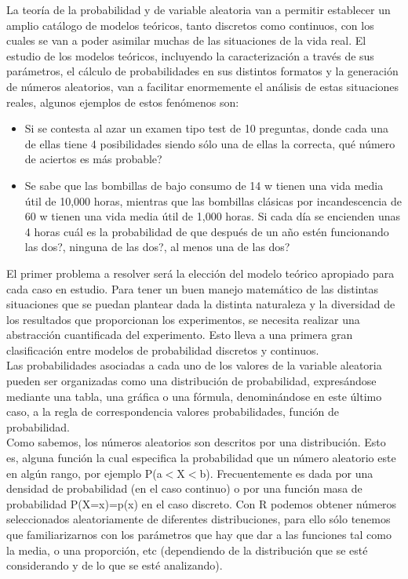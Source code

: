 \documentclass[12pt,letterpaper]{article}\usepackage[]{graphicx}\usepackage[]{color}
\begin{document}
La teor\'ia de la probabilidad y de variable aleatoria van a permitir establecer un amplio cat\'alogo de modelos te\'oricos, tanto discretos como continuos, con los cuales se van a poder asimilar muchas de las situaciones de la vida real. El estudio de los modelos te\'oricos, incluyendo la caracterizaci\'on a trav\'es de sus par\'ametros, el c\'alculo de probabilidades en sus distintos formatos y la generaci\'on de n\'umeros aleatorios, van a facilitar enormemente el an\'alisis de estas situaciones reales, algunos ejemplos de estos fen\'omenos son:\\

\begin{itemize}
  \item Si se contesta al azar un examen tipo test de 10 preguntas, donde cada una de ellas tiene 4 posibilidades siendo s\'olo una de ellas la correcta, \¿qu\'e n\'umero de aciertos es m\'as probable? 
  \item Se sabe que las bombillas de bajo consumo de 14 w tienen una vida media \'util de 10,000 horas, mientras que las bombillas cl\'asicas por incandescencia de 60 w tienen una vida media \'util de 1,000 horas. Si cada d\'ia se encienden unas 4 horas \¿cu\'al es la probabilidad de que despu\'es de un a\~no est\'en funcionando las dos?, \¿ninguna de las dos?, \¿al menos una de las dos? 
\end{itemize}

El primer problema a resolver ser\'a la elecci\'on del modelo te\'orico apropiado para cada caso en estudio. Para tener un buen manejo matem\'atico de las distintas situaciones que se puedan plantear dada la distinta naturaleza y la diversidad de los resultados que proporcionan los experimentos, se necesita realizar una abstracci\'on cuantificada del experimento. Esto lleva a una primera gran clasificaci\'on entre modelos de probabilidad discretos y continuos.\\

Las probabilidades asociadas a cada uno de los valores de la variable aleatoria pueden ser organizadas como una distribuci\'on de probabilidad, expres\'andose mediante una tabla, una gr\'afica o una f\'ormula, denomin\'andose en este \'ultimo caso, a la regla de correspondencia valores \ probabilidades, funci\'on de probabilidad.\\

Como sabemos, los n\'umeros aleatorios son descritos por una distribuci\'on. Esto es, alguna funci\'on la cual especifica la probabilidad que un n\'umero aleatorio este en alg\'un rango, por ejemplo P(a$<$X$<$b). Frecuentemente es dada por una densidad de probabilidad (en el caso continuo) o por una funci\'on masa de probabilidad P(X=x)=p(x) en el caso discreto. Con R podemos obtener n\'umeros seleccionados aleatoriamente de diferentes distribuciones, para ello s\'olo tenemos que familiarizarnos con los par\'ametros que hay que dar a las funciones tal como la media, o una proporci\'on, etc (dependiendo de la distribuci\'on que se est\'e considerando y de lo que se est\'e analizando).\\
\end{document}
